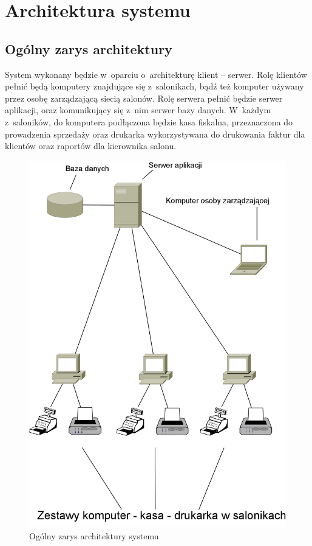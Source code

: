 \section{Architektura systemu}
\subsection{Ogólny zarys architektury}
System wykonany będzie w~oparciu o~architekturę klient -- serwer. Rolę klientów pełnić będą komputery znajdujące się z~salonikach, bądź też komputer używany przez osobę zarządzającą siecią salonów. Rolę serwera pełnić będzie serwer aplikacji, oraz komunikujący się z~nim serwer bazy danych. W~każdym z~saloników, do komputera podłączona będzie kasa fiskalna, przeznaczona do prowadzenia sprzedaży oraz drukarka wykorzystywana do drukowania faktur dla klientów oraz raportów dla kierownika salonu.
\begin{figure}
\includegraphics[width=1\textwidth]{gfx/architektura.png}
\caption{Ogólny zarys architektury systemu}
\end{figure}
